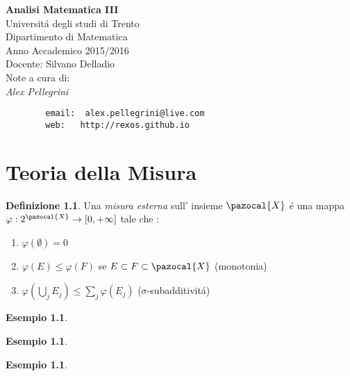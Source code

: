 \documentclass[11pt,a4paper]{report}
\theoremstyle{plain}
\theoremstyle{definition}
\newtheorem{defn}[thm]{Definizione} %
\newtheorem{exmp}[thm]{Esempio} %
\begin{document}
\begin{titlepage}
   \begin{center}
      \Huge\textbf{Analisi Matematica III}\\
      \LARGE Universit\'a degli studi di Trento\\
      \Large Dipartimento di Matematica\\
      \large Anno Accademico 2015/2016\\
      \large Docente: Silvano Delladio\\
      \bigskip
      \large Note a cura di:\\
      \Large\textit{Alex Pellegrini}\\
      \begin{verbatim}
      	email:	alex.pellegrini@live.com
      	web:   http://rexos.github.io
      \end{verbatim}
   \end{center}
\end{titlepage}


\tableofcontents
\chapter{Teoria della Misura}
\begin{defn}
Una \textit{misura esterna} sull' insieme $\pazocal{X}$ \'e una mappa\\
 $\varphi:2^{\pazocal{X}} \rightarrow [0, +\infty]$ tale che :\\
\begin{enumerate}
	\item $\varphi(\emptyset) = 0$
	\item $\varphi(E) \le \varphi(F)$ se $E \subset F \subset \pazocal{X}$ (monotonia)
	\item $\varphi(\bigcup\limits_{j}E_j) \le \sum\limits_{j}\varphi(E_j)$ ($\sigma$-subadditivit\'a)
\end{enumerate}
\end{defn}

\begin{exmp}
\end{exmp}

\begin{exmp}
\end{exmp}

\begin{exmp}
\end{exmp}
\end{document}
